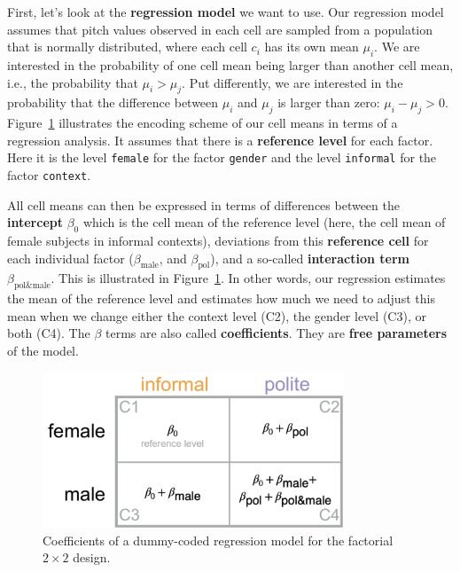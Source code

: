 \documentclass[nobib]{tufte-handout}
\newcommand{\tr}[1]{\textcolor{DarkOrange}{[tr: #1]}}
\begin{document}
First, let's look at the \textbf{regression model} we want to use.
Our regression model assumes that pitch values observed in each cell are
sampled from a population that is normally distributed, where each cell $c_i$ has its own mean $\mu_i$. We are interested in the probability of one cell mean being larger than another cell mean, i.e., the probability that $\mu_i > \mu_j$. Put differently, we are interested in the probability that the difference between $\mu_i$ and $\mu_j$ is larger than zero: $\mu_i - \mu_j > 0$.
Figure~\ref{fig:coefficients_table} illustrates the encoding scheme of our cell means in terms of a regression analysis. It assumes that
there is a \textbf{reference level} for each factor. Here it is the level \texttt{female} for
the factor \texttt{gender} and the level \texttt{informal} for the factor
\texttt{context}. 
  
All cell means can then be expressed in terms of differences between the \textbf{intercept}
$\beta_0$ which is the cell mean of the reference level (here, the cell mean of female subjects
in informal contexts), deviations from this \textbf{reference cell} for each individual factor
($\beta_{\text{male}}$, and $\beta_{\text{pol}}$), and a so-called \textbf{interaction term}
$\beta_{\text{pol\&male}}$. This is illustrated in Figure~\ref{fig:coefficients_table}. In
other words, our regression estimates the mean of the reference level and estimates how much we
need to adjust this mean when we change either the context level (C2), the gender level (C3),
or both (C4). The $\beta$ terms are also called \textbf{coefficients}. They are \textbf{free
  parameters} of the model.

\begin{figure}[]
  \centering
    \includegraphics[width = 0.8\textwidth]{pics/table_coefficients.pdf}
    \caption{Coefficients of a dummy-coded regression model for the factorial $2 \times 2$ design.}
    \label{fig:coefficients_table}
\end{figure}
\end{document}
